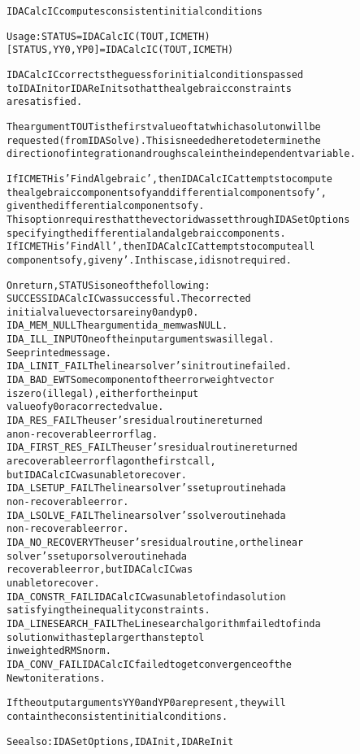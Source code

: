 \begin{alltt}
IDACalcIC computes consistent initial conditions

   Usage: STATUS = IDACalcIC ( TOUT, ICMETH )
          [STATUS, YY0, YP0] = IDACalcIC ( TOUT, ICMETH )

   IDACalcIC corrects the guess for initial conditions passed
   to IDAInit or IDAReInit so that the algebraic constraints
   are satisfied. 

   The argument TOUT is the first value of t at which a soluton will be      
   requested (from IDASolve). This is needed here to determine the 
   direction of integration and rough scale in the independent variable. 

   If ICMETH is 'FindAlgebraic', then IDACalcIC attempts to compute 
   the algebraic components of y and differential components of y', 
   given the differential components of y.  
   This option requires that the vector id was set through IDASetOptions  
   specifying the differential and algebraic components.
   If ICMETH is 'FindAll', then IDACalcIC attempts to compute all  
   components of y, given y'.  In this case, id is not required. 

   On return, STATUS is one of the following:
 SUCCESS             IDACalcIC was successful.  The corrected   
                     initial value vectors are in y0 and yp0.
 IDA_MEM_NULL        The argument ida_mem was NULL.             
 IDA_ILL_INPUT       One of the input arguments was illegal.    
                     See printed message.                       
 IDA_LINIT_FAIL      The linear solver's init routine failed.   
 IDA_BAD_EWT         Some component of the error weight vector  
                     is zero (illegal), either for the input    
                     value of y0 or a corrected value.          
 IDA_RES_FAIL        The user's residual routine returned 
                     a non-recoverable error flag.              
 IDA_FIRST_RES_FAIL  The user's residual routine returned 
                     a recoverable error flag on the first call,
                     but IDACalcIC was unable to recover.       
 IDA_LSETUP_FAIL     The linear solver's setup routine had a    
                     non-recoverable error.                     
 IDA_LSOLVE_FAIL     The linear solver's solve routine had a    
                     non-recoverable error.                     
 IDA_NO_RECOVERY     The user's residual routine, or the linear 
                     solver's setup or solve routine had a      
                     recoverable error, but IDACalcIC was       
                     unable to recover.                         
 IDA_CONSTR_FAIL     IDACalcIC was unable to find a solution    
                     satisfying the inequality constraints.     
 IDA_LINESEARCH_FAIL The Linesearch algorithm failed to find a  
                     solution with a step larger than steptol   
                     in weighted RMS norm.
 IDA_CONV_FAIL       IDACalcIC failed to get convergence of the 
                     Newton iterations.  

   If the output arguments YY0 and YP0 are present, they will
   contain the consistent initial conditions.

  See also: IDASetOptions, IDAInit, IDAReInit
\end{alltt}






\vspace{0.1in}